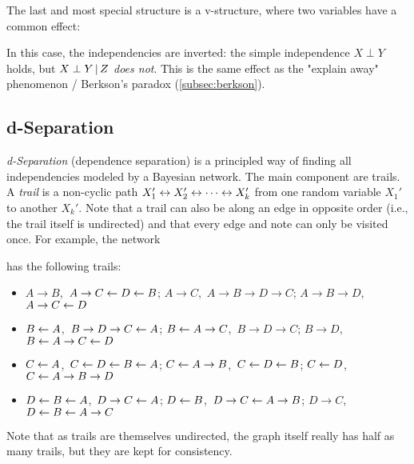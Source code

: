 			The last and most special structure is a v-structure, where two variables have a common effect:
			\begin{center}
			\end{center}
			In this case, the independencies are inverted: the simple independence \( X \perp Y \) holds, but \( X \perp Y \,\vert\, Z \) \emph{does not}. This is the same effect as the "explain away" phenomenon / Berkson's paradox (\autoref{subsec:berkson}).

		\subsection{d-Separation}
			\emph{d-Separation} (dependence separation) is a principled way of finding all independencies modeled by a Bayesian network. The main component are trails. A \emph{trail} is a non-cyclic path \( X_1' \leftrightarrow X_2' \leftrightarrow \cdots \leftrightarrow X_k' \) from one random variable \(X_1'\) to another \(X_k'\). Note that a trail can also be along an edge in opposite order (i.e., the trail itself is undirected) and that every edge and note can only be visited once. For example, the network
			\begin{center}
			\end{center}
			has the following trails:
			\begin{itemize}
				\item \( A \to B \),\, \( A \to C \leftarrow D \leftarrow B \);\; \( A \to C \),\, \( A \to B \to D \to C \);\; \( A \to B \to D \),\, \( A \to C \leftarrow D \)
				\item \( B \leftarrow A \),\, \( B \to D \to C \leftarrow A \);\; \( B \leftarrow A \to C \),\, \( B \to D \to C \);\; \( B \to D \),\, \( B \leftarrow A \to C \leftarrow D \)
				\item \( C \leftarrow A \),\, \( C \leftarrow D \leftarrow B \leftarrow A \);\; \( C \leftarrow A \to B \),\, \( C \leftarrow D \leftarrow B \);\; \( C \leftarrow D \),\, \( C \leftarrow A \to B \to D \)
				\item \( D \leftarrow B \leftarrow A \),\, \( D \to C \leftarrow A \);\; \( D \leftarrow B \),\, \( D \to C \leftarrow A \to B \);\; \( D \to C \),\, \( D \leftarrow B \leftarrow A \to C \)
			\end{itemize}
			Note that as trails are themselves undirected, the graph itself really has half as many trails, but they are kept for consistency.

